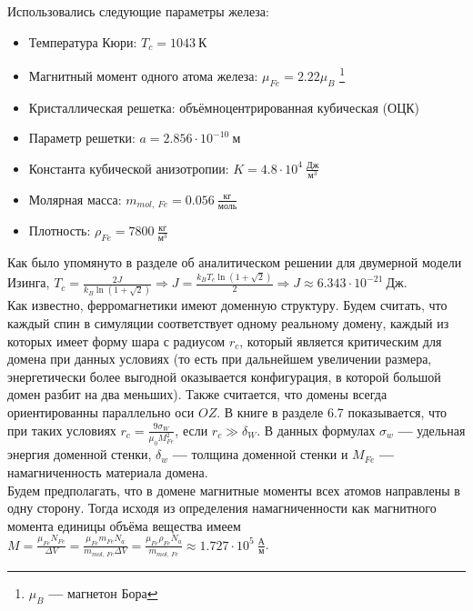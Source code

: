 \documentclass[oneside,final,14pt]{extarticle}
\begin{document}
	\noindent Использовались следующие параметры железа: 
	\begin{itemize}
		\item Температура Кюри: $T_c=1043 \ \text{К}$
		\item Магнитный момент одного атома железа: $\mu_{Fe}=2.22\mu_{B}$ \footnote{$\mu_{B}$ \textbf{---} магнетон Бора}
		\item Кристаллическая решетка: объёмноцентрированная кубическая (ОЦК)
		\item Параметр решетки: $a=2.856 \cdot 10^{-10} \ \text{м}$
		\item Константа кубической анизотропии: $K=4.8 \cdot 10^{4} \ \frac{\text{Дж}}{\text{м}^3}$
		\item Молярная масса: $m_{mol, \ Fe}=0.056 \ \frac{\text{кг}}{\text{моль}}$
		\item Плотность: $\rho_{Fe}=7800 \ \frac{\text{кг}}{\text{м}^3}$
	\end{itemize}
	
	\noindent Как было упомянуто в разделе об аналитическом решении для двумерной модели Изинга, $T_{c}=\frac{2J}{k_{B}\ln(1+\sqrt{2})} \Rightarrow J=\frac{k_{B}T_{c}\ln(1+\sqrt{2})}{2} \Rightarrow \boxed{J \approx 6.343 \cdot 10^{-21} \ \text{Дж}}$. \\
	
	\noindent Как известно, ферромагнетики имеют доменную структуру. Будем считать, что каждый спин в симуляции соответствует одному реальному домену, каждый из которых имеет форму шара с радиусом $r_{c}$, который является критическим для домена при данных условиях (то есть при дальнейшем увеличении размера, энергетически более выгодной оказывается конфигурация, в которой большой домен разбит на два меньших). Также считается, что домены всегда ориентированны параллельно оси $OZ$. В книге \cite{magn} в разделе 6.7 показывается, что при таких условиях $r_{c}=\frac{9\sigma_{W}}{\mu_{0}M_{Fe}^2}$, если $r_{c}\gg \delta_{W}$. В данных формулах $\sigma_{w}$ \textbf{---} удельная энергия доменной стенки, $\delta_{w}$ \textbf{---} толщина доменной стенки и $M_{Fe}$ \textbf{---} намагниченность материала домена. \\
	
	\noindent Будем предполагать, что в домене магнитные моменты всех атомов направлены в одну сторону. Тогда исходя из определения намагниченности как магнитного момента единицы объёма вещества имеем $M=\frac{\mu_{Fe}N_{Fe}}{\Delta V}=\frac{\mu_{Fe}m_{Fe}N_{a}}{m_{mol, \ Fe}\Delta V}=\frac{\mu_{Fe}\rho_{Fe}N_{a}}{m_{mol, \ Fe}}\approx 1.727 \cdot 10^{5} \ \frac{\text{А}}{\text{м}}$. \\
	
\end{document}
